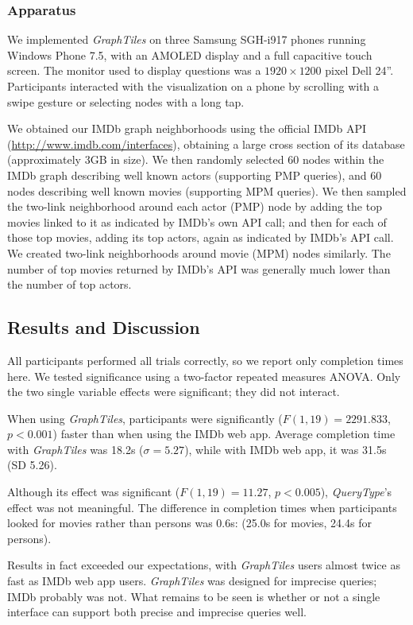 \documentclass{sigchi}
\begin{document}
\subsubsection{Apparatus}

We implemented \textit{GraphTiles} on three Samsung SGH-i917 phones running Windows Phone 7.5, with an AMOLED display and a full capacitive touch screen. The monitor used to display questions was a $1920 \times 1200$ pixel Dell 24''. Participants interacted with the visualization on a phone by scrolling with a swipe gesture or selecting nodes with a long tap.

We obtained our IMDb graph neighborhoods using the official IMDb API (\url{http://www.imdb.com/interfaces}), obtaining a large cross section of its database (approximately 3GB in size). We then randomly selected 60 nodes within the IMDb graph describing well known actors (supporting PMP queries), and 60 nodes describing well known movies (supporting MPM queries). We then sampled the two-link neighborhood around each actor (PMP) node by adding the top movies linked to it as indicated by IMDb's own API call; and then for each of those top movies, adding its top actors, again as indicated by IMDb's API call. We created two-link neighborhoods around movie (MPM) nodes similarly. The number of top movies returned by IMDb's API was generally much lower than the number of top actors. 


\subsection{Results and Discussion}

All participants performed all trials correctly, so we report only completion times here. We tested significance using a two-factor repeated measures ANOVA. Only the two single variable effects were significant; they did not interact. 

When using \textit{GraphTiles}, participants were significantly ($F(1,19)=2291.833$, $p<0.001$) faster than when using the IMDb web app. Average completion time with \textit{GraphTiles} was 18.2s ($\sigma =5.27$), while with IMDb web app, it was 31.5s (SD 5.26).

Although its effect was significant ($F(1,19)=11.27$, $p<0.005$), \textit{QueryType}'s effect was not meaningful. The difference in completion times when participants looked for movies rather than persons was 0.6s: (25.0s for movies, 24.4s for persons). 


Results in fact exceeded our expectations, with \textit{GraphTiles} users almost twice as fast as IMDb web app users. \textit{GraphTiles} was designed for imprecise queries; IMDb probably was not. What remains to be seen is whether or not a single interface can support both precise and imprecise queries well.
\end{document}
